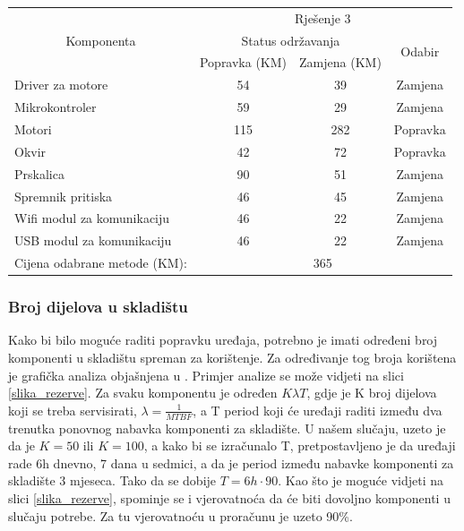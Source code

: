 \documentclass[12pt]{article}
\begin{document}
\begin{landscape}
\begin{table}[htbp]
        \begin{tabular}{lccc}
    \toprule
    \multicolumn{1}{c}{\multirow{3}[6]{*}{Komponenta}} & \multicolumn{3}{c}{Rješenje 3} \\
\cmidrule{2-4}          & \multicolumn{2}{c}{Status održavanja} & \multirow{2}[4]{*}{Odabir} \\
\cmidrule{2-3}          & Popravka (KM) & Zamjena (KM) &  \\
    \midrule
    Driver za motore & 54    & 39    & Zamjena \\
    Mikrokontroler & 59    & 29    & Zamjena \\
    \midrule
    Motori & 115   & 282   & Popravka \\
    Okvir & 42    & 72    & Popravka \\
    Prskalica & 90    & 51    & Zamjena \\
    Spremnik pritiska & 46    & 45    & Zamjena \\
    \midrule
    Wifi modul za komunikaciju & 46    & 22    & Zamjena \\
    USB modul za komunikaciju & 46    & 22    & Zamjena \\
    \midrule
    Cijena odabrane metode (KM): & \multicolumn{3}{c}{365} \\
    \bottomrule
    \end{tabular}%
  \label{tab:odrzavanje-rjesnje}%
\end{table}

\end{landscape}
\clearpage
\subsubsection{Broj dijelova u skladištu}
Kako bi bilo moguće raditi popravku uređaja, potrebno je imati određeni broj komponenti u skladištu spreman za korištenje. Za određivanje tog broja korištena je grafička analiza objašnjena u \cite{babuka}. Primjer analize se može vidjeti na slici \ref{slika_rezerve}. Za svaku komponentu je određen $K\lambda T$, gdje je K broj dijelova koji se treba servisirati, $\lambda = \frac{1}{MTBF}$, a T period koji će uređaji raditi između dva trenutka ponovnog nabavka komponenti za skladište. U našem slučaju, uzeto je da je $K = 50$ ili $K = 100$, a kako bi se izračunalo T, pretpostavljeno je da uređaji rade 6h dnevno, 7 dana u sedmici, a da je period između nabavke komponenti za skladište 3 mjeseca. Tako da se dobije $T = 6h \cdot 90$. Kao što je moguće vidjeti na slici \ref{slika_rezerve}, spominje se i vjerovatnoća da  će biti dovoljno komponenti u slučaju potrebe. Za tu vjerovatnoću u proračunu je uzeto 90\%. 
\end{document}
